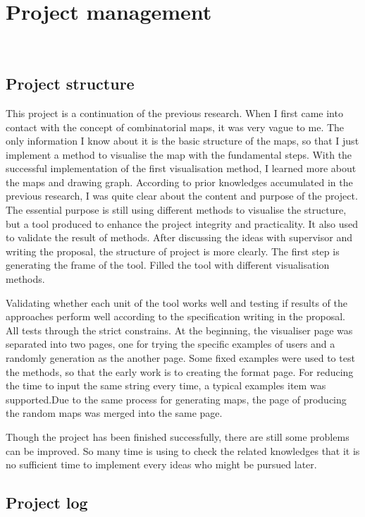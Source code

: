 \chapter{Project management}\
\section{Project structure}

This project is a continuation of the previous research. When I first came into contact with the concept of combinatorial maps, it was very vague to me.  The only information I know about it is the basic structure of  the maps, so that I just implement a method to visualise the map with the fundamental steps. With the successful implementation of the first visualisation method, I learned more about the maps and drawing graph. According to prior knowledges accumulated in the previous research, I was quite clear about the content and purpose of the project. The essential purpose is still using different methods to visualise the structure, but a tool produced to enhance the project integrity and practicality. It also used to validate the result of methods. After discussing the ideas with supervisor and writing the proposal, the structure of project is more clearly. The first step is generating the frame of the tool. Filled the tool with different visualisation methods.

Validating whether each unit of the tool works well and  testing if results of the approaches perform well according to the specification writing in the proposal. All tests through the strict constrains. At the beginning, the visualiser page was separated into two pages, one for trying the specific examples of users and a randomly generation as the another page. Some fixed examples were used to test the methods, so that the early work is to creating the format page. For reducing the time to input the same string every time, a typical examples item was supported.Due to the same process for generating maps, the page of producing the random maps was merged into the same page.

Though the project has been finished successfully, there are still some problems can be improved. So many time is using to check the related knowledges that it is no sufficient time to implement every ideas who might be pursued later.

\section{Project log}

